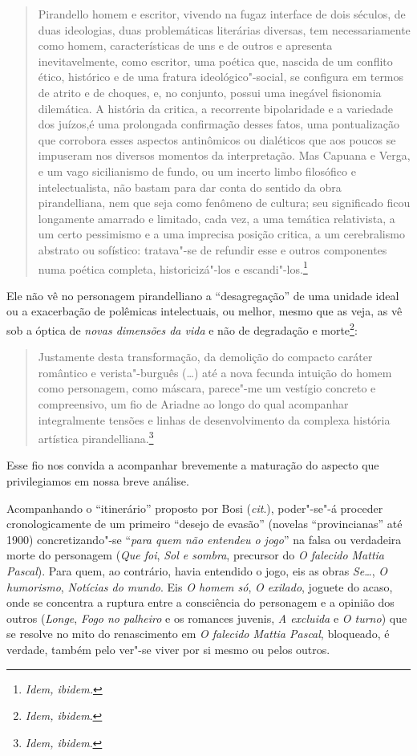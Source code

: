 \begin{quote}
Pirandello homem e escritor, vivendo na fugaz interface de dois
séculos, de duas ideologias, duas problemáticas literárias diversas, tem
necessariamente como homem, características de uns e de outros e
apresenta inevitavelmente, como escritor, uma poética que, nascida de um
conflito ético, histórico e de uma fratura ideológico"-social, se
configura em termos de atrito e de choques, e, no conjunto, possui uma
inegável fisionomia dilemática. A história da critica, a recorrente
bipolaridade e a variedade dos juízos,é uma prolongada confirmação
desses fatos, uma pontualização que corrobora esses aspectos
antinômicos ou dialéticos que aos poucos se impuseram nos diversos
momentos da interpretação. Mas Capuana e Verga, e um vago sicilianismo
de fundo, ou um incerto limbo filosófico e intelectualista, não
bastam para dar conta do sentido da obra pirandelliana, nem que seja
como fenômeno de cultura; seu significado ficou longamente amarrado e
limitado, cada vez, a uma temática relativista, a um certo pessimismo e a
uma imprecisa posição critica, a um cerebralismo abstrato ou sofístico:
tratava"-se de refundir esse e outros componentes numa poética completa,
historicizá"-los e escandi"-los.\footnote{\emph{Idem, ibidem.}}
\end{quote}

Ele não vê no personagem pirandelliano a ``desagregação'' de uma unidade
ideal ou a exacerbação de polêmicas intelectuais, ou melhor, mesmo que
as veja, as vê sob a óptica de \emph{novas dimensões da vida} e não de
degradação e morte\footnote{\emph{Idem, ibidem}.}:

\begin{quote}
Justamente desta transformação, da demolição do compacto
caráter romântico e verista"-burguês (\ldots{}) até a nova fecunda
intuição do homem como personagem, como máscara, parece"-me
um vestígio concreto e compreensivo, um fio de Ariadne ao longo do qual
acompanhar integralmente tensões e linhas de desenvolvimento da complexa
história artística pirandelliana.\footnote{\emph{Idem, ibidem}.}
\end{quote}

Esse fio nos convida a acompanhar brevemente a maturação do aspecto que
privilegiamos em nossa breve análise.

Acompanhando o ``itinerário'' proposto por Bosi (\emph{cit}.),
poder"-se"-á proceder cronologicamente de um primeiro ``desejo de evasão''
(novelas ``provincianas'' até 1900) concretizando"-se ``\emph{para quem
não entendeu o jogo}'' na falsa ou verdadeira morte do personagem
(\emph{Que foi}, \emph{Sol e sombra}, precursor do \emph{O falecido Mattia Pascal}). Para quem, ao contrário, havia entendido o jogo,
eis as obras \emph{Se\ldots{}}, \emph{O humorismo}, \emph{Notícias do mundo}.
Eis \emph{O homem só}, \emph{O exilado}, joguete do acaso, onde
se concentra a ruptura entre a consciência do personagem e a opinião dos
outros (\emph{Longe}, \emph{Fogo no palheiro} e os romances juvenis,
\emph{A excluida} e \emph{O turno}) que se resolve no mito do
renascimento em \emph{O falecido Mattia Pascal}, bloqueado, é verdade,
também pelo ver"-se viver por si mesmo ou pelos outros.

